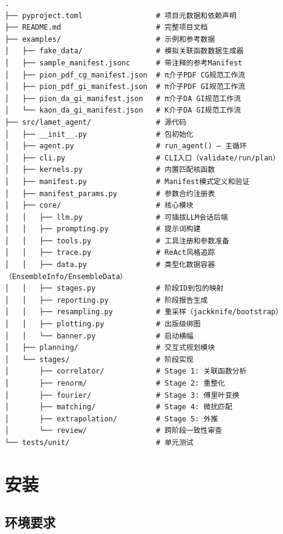 \documentclass[12pt,a4paper]{ctexart}
\begin{document}
\begin{lstlisting}[caption={lamet-agent 项目目录结构}, label={lst:structure}]
.
├── pyproject.toml                 # 项目元数据和依赖声明
├── README.md                      # 完整项目文档
├── examples/                      # 示例和参考数据
│   ├── fake_data/                 # 模拟关联函数数据生成器
│   ├── sample_manifest.jsonc      # 带注释的参考Manifest
│   ├── pion_pdf_cg_manifest.json  # π介子PDF CG规范工作流
│   ├── pion_pdf_gi_manifest.json  # π介子PDF GI规范工作流
│   ├── pion_da_gi_manifest.json   # π介子DA GI规范工作流
│   └── kaon_da_gi_manifest.json   # K介子DA GI规范工作流
├── src/lamet_agent/               # 源代码
│   ├── __init__.py                # 包初始化
│   ├── agent.py                   # run_agent() — 主循环
│   ├── cli.py                     # CLI入口（validate/run/plan）
│   ├── kernels.py                 # 内置匹配核函数
│   ├── manifest.py                # Manifest模式定义和验证
│   ├── manifest_params.py         # 参数合约注册表
│   ├── core/                      # 核心模块
│   │   ├── llm.py                 # 可插拔LLM会话后端
│   │   ├── prompting.py           # 提示词构建
│   │   ├── tools.py               # 工具注册和参数准备
│   │   ├── trace.py               # ReAct风格追踪
│   │   ├── data.py                # 类型化数据容器（EnsembleInfo/EnsembleData）
│   │   ├── stages.py              # 阶段ID到包的映射
│   │   ├── reporting.py           # 阶段报告生成
│   │   ├── resampling.py          # 重采样（jackknife/bootstrap）
│   │   ├── plotting.py            # 出版级绑图
│   │   └── banner.py              # 启动横幅
│   ├── planning/                  # 交互式规划模块
│   └── stages/                    # 阶段实现
│       ├── correlator/            # Stage 1: 关联函数分析
│       ├── renorm/                # Stage 2: 重整化
│       ├── fourier/               # Stage 3: 傅里叶变换
│       ├── matching/              # Stage 4: 微扰匹配
│       ├── extrapolation/         # Stage 5: 外推
│       └── review/                # 跨阶段一致性审查
└── tests/unit/                    # 单元测试
\end{lstlisting}

\section{安装}

\subsection{环境要求}
\end{document}
